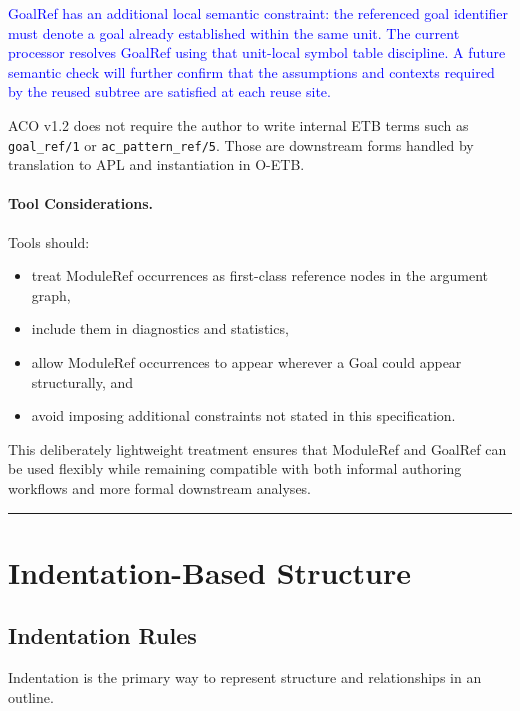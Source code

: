 \documentclass[11pt,twoside,a4paper]{article}
\begin{document}
\textcolor{blue}{GoalRef has an additional local semantic constraint: the referenced goal identifier must denote a goal already established within the same unit. The current processor resolves GoalRef using that unit-local symbol table discipline. A future semantic check will further confirm that the assumptions and contexts required by the reused subtree are satisfied at each reuse site.}

ACO v1.2 does not require the author to write internal ETB terms such as \texttt{goal\_ref/1} or \texttt{ac\_pattern\_ref/5}. Those are downstream forms handled by translation to APL and instantiation in O-ETB.

\paragraph{Tool Considerations.}
Tools should:
\begin{itemize}[leftmargin=2em]
  \item treat ModuleRef occurrences as first-class reference nodes in the argument graph,
  \item include them in diagnostics and statistics,
  \item allow ModuleRef occurrences to appear wherever a Goal could appear structurally, and
  \item avoid imposing additional constraints not stated in this specification.
\end{itemize}

This deliberately lightweight treatment ensures that ModuleRef and GoalRef can be used
flexibly while remaining compatible with both informal authoring workflows and
more formal downstream analyses.


\bigskip
\hrule
\bigskip

\section{Indentation-Based Structure}

\subsection{Indentation Rules}

Indentation is the primary way to represent structure and relationships in an outline.
\end{document}
